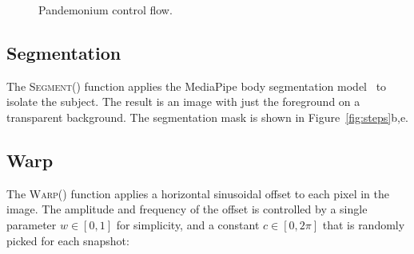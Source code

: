 \documentclass[twocolumn]{article}
\begin{document}
\begin{figure}
\caption{Pandemonium control flow.}
\label{fig:controlflow}
\end{figure}

\subsection{Segmentation}
The \textsc{Segment}() function applies the MediaPipe body segmentation model~\cite{selfie-segmentation} to isolate the subject. The result is an image with just the foreground on a transparent background. The segmentation mask is shown in Figure~\ref{fig:steps}b,e.

\subsection{Warp}
The \textsc{Warp}() function applies a horizontal sinusoidal offset to each pixel in the image. The amplitude and frequency of the offset is controlled by a single parameter $w \in [0,1]$ for simplicity, and a constant $c \in [0, 2\pi]$ that is randomly picked for each snapshot:
\end{document}
